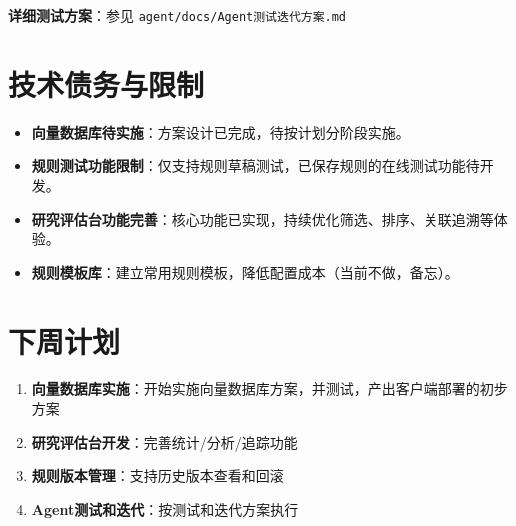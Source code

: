 \documentclass[UTF8]{ctexart}
\begin{document}
\textbf{详细测试方案}：参见 \texttt{agent/docs/Agent测试迭代方案.md}

\section{技术债务与限制}

\begin{itemize}
    \item \textbf{向量数据库待实施}：方案设计已完成，待按计划分阶段实施。
    \item \textbf{规则测试功能限制}：仅支持规则草稿测试，已保存规则的在线测试功能待开发。
    \item \textbf{研究评估台功能完善}：核心功能已实现，持续优化筛选、排序、关联追溯等体验。
    \item \textbf{规则模板库}：建立常用规则模板，降低配置成本（当前不做，备忘）。
\end{itemize}

\section{下周计划}

\begin{enumerate}
    \item \textbf{向量数据库实施}：开始实施向量数据库方案，并测试，产出客户端部署的初步方案
    \item \textbf{研究评估台开发}：完善统计/分析/追踪功能
    \item \textbf{规则版本管理}：支持历史版本查看和回滚
    \item \textbf{Agent测试和迭代}：按测试和迭代方案执行
\end{enumerate}
\end{document}
